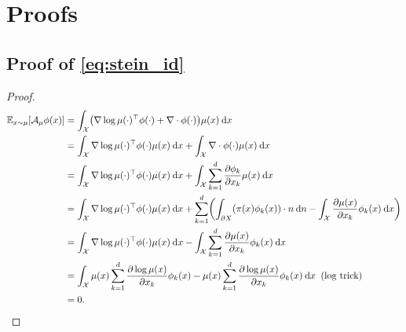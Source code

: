 \documentclass{article}
\newcommand{\E}{\mathbb{E}}
\newcommand{\X}{\mathcal{X}}
\newcommand{\A}{\mathcal{A}}
\newcommand{\diff}[2]{\frac{\partial #1}{\partial #2}}
\renewcommand{\d}{\: \mathrm{d}}
\DeclarePairedDelimiter{\pare}{(}{)}
\begin{document}



\appendix

\section{Proofs}
\subsection{Proof of \eqref{eq:stein_id}}
\begin{proof}\label{proof:stein_id}
  \begin{align*}
    \E_{x \sim \mu}[\A_\mu \phi (x)] &=
      \int_\X \pare*{ \nabla \log \mu(\cdot)^\top \phi(\cdot) + \nabla \cdot \phi(\cdot) } \mu(x) \d x \\
    &= \int_\X \nabla \log \mu(\cdot)^\top \phi(\cdot) \mu(x) \d x + \int_\X \nabla \cdot \phi(\cdot) \mu(x) \d x \\
    &= \int_\X \nabla \log \mu(\cdot)^\top \phi(\cdot) \mu(x) \d x +
      \int_\X \sum_{k=1}^d \diff{\phi_k}{x_k} \mu(x) \d x \\
    &= \int_\X \nabla \log \mu(\cdot)^\top \phi(\cdot) \mu(x) \d x +
    \sum_{k=1}^d \pare*{\int_{\partial X}\pare*{\pi(x) \phi_k(x)} \cdot n \d n - \int_\X \diff{\mu(x)}{x_k} \phi_k(x) \d x} \\
    &= \int_\X \nabla \log \mu(\cdot)^\top \phi(\cdot) \mu(x) \d x -
      \int_\X \sum_{k=1}^d \diff{\mu(x)}{x_k} \phi_k(x) \d x \\
    &= \int_\X  \mu(x) \sum_{k=1}^d \diff{\log \mu(x)}{x_k}\phi_k(x) -
    \mu(x) \sum_{k=1}^d \diff{\log \mu(x)}{x_k} \phi_k(x) \d x \;\; \text{(log trick)} \\
    &= 0.
  \end{align*}
\end{proof}
\end{document}
